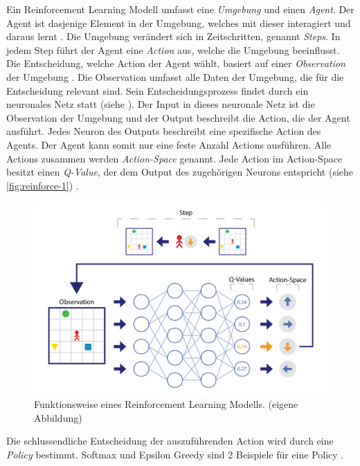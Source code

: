 Ein Reinforcement Learning Modell umfasst eine \emph{Umgebung} und einen
\emph{Agent}. Der Agent ist dasjenige Element in der Umgebung, welches mit
dieser interagiert und daraus lernt \cite[S. 53]{sutton_reinforcement_2014}. Die
Umgebung verändert sich in Zeitschritten, genannt \emph{Steps}. In jedem Step
führt der Agent eine \emph{Action} aus, welche die Umgebung beeinflusst. Die
Entscheidung, welche Action der Agent wählt, basiert auf einer
\emph{Observation} der Umgebung \cite[S. 2]{mnih_playing_2013}. Die Observation
umfasst alle Daten der Umgebung, die für die Entscheidung relevant sind. Sein
Entscheidungsprozess findet durch ein neuronales Netz statt (siehe
). Der Input in dieses neuronale Netz ist die Observation
der Umgebung und der Output beschreibt die Action, die der Agent ausführt. Jedes
Neuron des Outputs beschreibt eine spezifische Action des Agents. Der Agent kann
somit nur eine feste Anzahl Actions ausführen. Alle Actions zusammen werden
\emph{Action-Space} \cite[S. 67]{sutton_reinforcement_2014} genannt. Jede Action
im Action-Space besitzt einen \emph{Q-Value}, der dem Output des zugehörigen
Neurons entspricht (siehe \autoref{fig:reinforce-1}) \cite{wang_deep_2021}. 


\begin{figure}[!ht]
    \centering
    \includegraphics[width=\textwidth-1cm]{images/theorie/reinforce-1.png}
    \caption{Funktionsweise eines Reinforcement Learning Modells. (eigene Abbildung)}\label{fig:reinforce-1}
 \end{figure}

Die schlussendliche Entscheidung der auszuführenden Action wird durch eine
\emph{Policy} bestimmt. Softmax und Epsilon Greedy sind 2 Beispiele für eine
Policy \cite[S. 34]{sutton_reinforcement_2014}. 

